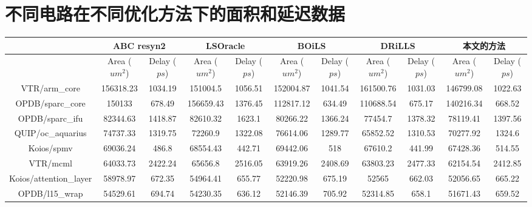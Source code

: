 \chapter{不同电路在不同优化方法下的面积和延迟数据} \label{所有电路在不同优化方法下的面积和延迟}


{
\tiny
\setlength{\tabcolsep}{1pt}
\begin{longtable}{|*{11}{c|}}
        \hline
        & \multicolumn{2}{|c|}{ABC resyn2} & \multicolumn{2}{|c|}{LSOracle\cite{LS:LSOracle}} & \multicolumn{2}{|c|}{BOiLS\cite{LS:BOiLS}} & \multicolumn{2}{|c|}{DRiLLS\cite{LS:DRiLLS}} & \multicolumn{2}{|c|}{本文的方法}\\
        \hline
        & Area ($um^2$) & Delay ($ps$) & Area ($um^2$) & Delay ($ps$) & Area ($um^2$) & Delay ($ps$) & Area ($um^2$) & Delay ($ps$) & Area ($um^2$) & Delay ($ps$) \\
        \hline
        VTR/arm\_core & 156318.23 & 1034.19 & 151004.5 & 1056.51 & 152004.87 & 1041.54 & 161500.76 & 1031.03 & 146799.08 & 1022.63 \\
        \hline
        OPDB/sparc\_core & 150133 & 678.49 & 156659.43 & 1376.45 & 112817.12 & 634.49 & 110688.54 & 675.17 & 140216.34 & 668.52 \\
        \hline
        OPDB/sparc\_ifu & 82344.63 & 1418.87 & 82610.32 & 1623.1 & 80266.22 & 1366.24 & 77454.7 & 1378.32 & 78119.41 & 1397.56 \\
        \hline
        QUIP/oc\_aquarius & 74737.33 & 1319.75 & 72260.9 & 1322.08 & 76614.06 & 1289.77 & 65852.52 & 1310.53 & 70277.92 & 1324.6 \\
        \hline
        Koios/spmv & 69036.24 & 486.8 & 68554.43 & 442.71 & 69442.06 & 518 & 67610.2 & 441.99 & 67428.36 & 514.55 \\
        \hline
        VTR/mcml & 64033.73 & 2422.24 & 65656.8 & 2516.05 & 63919.26 & 2408.69 & 63803.23 & 2477.33 & 62154.54 & 2412.85 \\
        \hline
        Koios/attention\_layer & 58978.97 & 672.35 & 54964.41 & 655.77 & 52220.98 & 675.19 & 52565 & 662.03 & 52056.65 & 665.22 \\
        \hline
        OPDB/l15\_wrap & 54529.61 & 694.74 & 54230.35 & 636.12 & 52146.39 & 705.92 & 52314.85 & 658.1 & 51671.43 & 659.52 \\

\end{longtable}}
